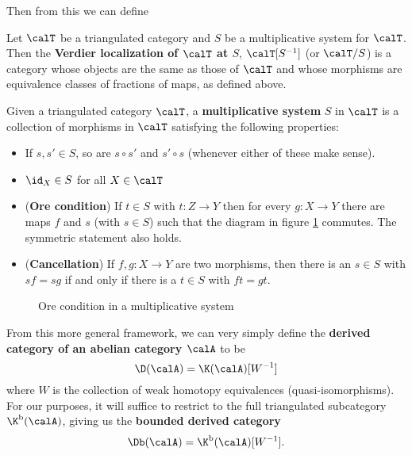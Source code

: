 \documentclass[12pt]{article}
\begin{document}
		Then from this we can define
		\begin{defn}
			Let $\calT$ be a triangulated category and $S$ be a multiplicative system for $\calT$. Then the \textbf{Verdier localization of $\calT$ at $S$}, 
			$\calT[S^{-1}]$ (or $\calT/S$) is a category whose objects are the same as those of $\calT$ and whose morphisms are equivalence classes of 
			fractions of maps, as defined above.
		\end{defn}
		\begin{defn}
			Given a triangulated category $\calT$, a \textbf{multiplicative system} $S$ in $\calT$ is a collection of morphisms 
			in $\calT$ satisfying the following properties:
			\begin{itemize}
				\item If $s,s'\in S$, so are $s\circ s'$ and $s'\circ s$ (whenever either of these make sense).
				\item $\id_X\in S$ for all $X\in\calT$
				\item (\textbf{Ore condition}) If $t\in S$ with $t:Z\to Y$ then for every $g:X\to Y$ there are maps $f$ and $s$ (with $s\in S$) such that the diagram in figure \ref{fig:fractions} commutes. The symmetric statement also holds.
				\item (\textbf{Cancellation}) If $f,g:X\to Y$ are two morphisms, then there is an $s\in S$ with $sf=sg$ if and only if there is a $t\in S$ with $ft=gt$.
			\end{itemize}
		\end{defn}
		\begin{figure}
			\centering
			\caption{Ore condition in a multiplicative system}
			\label{fig:fractions}
		\end{figure}
		From this more general framework, we can very simply define the \textbf{derived category of an abelian category $\calA$}
		to be 
		\[\D(\calA)=\K(\calA)[W^{-1}]\]
		where $W$ is the collection of weak homotopy equivalences (quasi-isomorphisms). For our purposes, it will suffice 
		to restrict to the full triangulated subcategory $\K^\text{b}(\calA)$, giving us the \textbf{bounded derived category}
		\[\Db(\calA)=\K^\text{b}(\calA)[W^{-1}].\]
\end{document}
